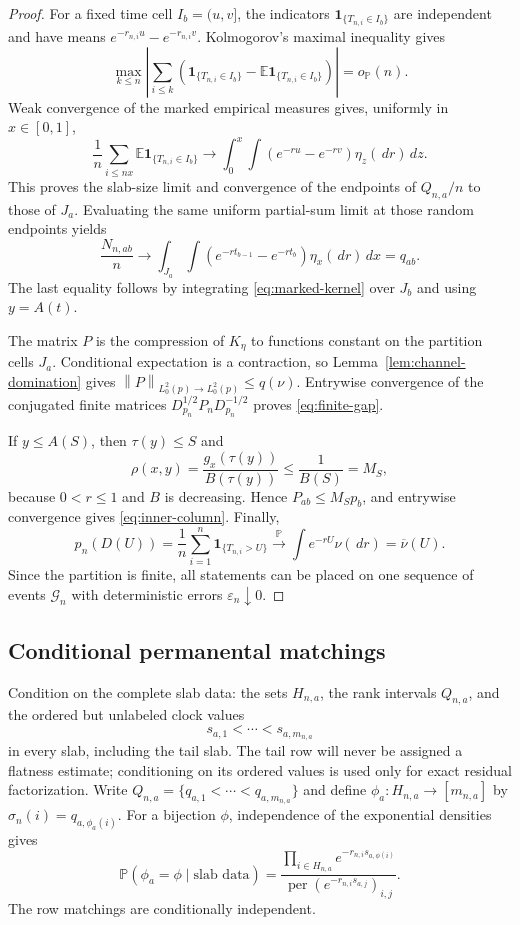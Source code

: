 \documentclass[11pt]{article}
\theoremstyle{definition}
\theoremstyle{remark}
\newcommand{\Pp}{\mathbb P}
\newcommand{\Ee}{\mathbb E}
\newcommand{\one}{\mathbf 1}
\newcommand{\dd}{\,d}
\newcommand{\eps}{\varepsilon}
\newcommand{\cG}{\mathcal G}
\newcommand{\norm}[1]{\left\lVert#1\right\rVert}
\begin{document}
\begin{proof}
For a fixed time cell $I_b=(u,v]$, the indicators
$\one_{\{T_{n,i}\in I_b\}}$ are independent and have means
$e^{-r_{n,i}u}-e^{-r_{n,i}v}$.  Kolmogorov's maximal inequality gives
\[
 \max_{k\le n}\left|\sum_{i\le k}
 \left(\one_{\{T_{n,i}\in I_b\}}
       -\Ee\one_{\{T_{n,i}\in I_b\}}\right)\right|=o_{\Pp}(n).
\]
Weak convergence of the marked empirical measures gives, uniformly in
$x\in[0,1]$,
\[
 \frac1n\sum_{i\le nx}\Ee\one_{\{T_{n,i}\in I_b\}}
 \longrightarrow
 \int_0^x\int
  (e^{-ru}-e^{-rv})\eta_z(\dd r)\dd z.
\]
This proves the slab-size limit and convergence of the endpoints of
$Q_{n,a}/n$ to those of $J_a$.  Evaluating the same uniform partial-sum limit
at those random endpoints yields
\[
 \frac{N_{n,ab}}n\longrightarrow
 \int_{J_a}\int(e^{-rt_{b-1}}-e^{-rt_b})\eta_x(\dd r)\dd x=q_{ab}.
\]
The last equality follows by integrating \eqref{eq:marked-kernel} over $J_b$
and using $y=A(t)$.

The matrix $P$ is the compression of $K_\eta$ to functions constant on the
partition cells $J_a$.  Conditional expectation is a contraction, so
Lemma~\ref{lem:channel-domination} gives
$\norm{P}_{L^2_0(p)\to L^2_0(p)}\le q(\nu)$.  Entrywise convergence of the
conjugated finite matrices
$D_{p_n}^{1/2}P_nD_{p_n}^{-1/2}$ proves \eqref{eq:finite-gap}.

If $y\le A(S)$, then $\tau(y)\le S$ and
\[
 \rho(x,y)=\frac{g_x(\tau(y))}{B(\tau(y))}
 \le\frac1{B(S)}=M_S,
\]
because $0<r\le1$ and $B$ is decreasing.  Hence
$P_{ab}\le M_Sp_b$, and entrywise convergence gives
\eqref{eq:inner-column}.  Finally,
\[
 p_n(D(U))=\frac1n\sum_{i=1}^n\one_{\{T_{n,i}>U\}}
 \xrightarrow{\Pp}\int e^{-rU}\nu(\dd r)=\overline\nu(U).
\]
Since the partition is finite, all statements can be placed on one sequence of
events $\cG_n$ with deterministic errors $\eps_n\downarrow0$.
\end{proof}

\subsection{Conditional permanental matchings}

Condition on the complete slab data: the sets $H_{n,a}$, the rank intervals
$Q_{n,a}$, and the ordered but unlabeled clock values
\[
 s_{a,1}<\cdots<s_{a,m_{n,a}}
\]
in every slab, including the tail slab.  The tail row will never be assigned a
flatness estimate; conditioning on its ordered values is used only for exact
residual factorization.  Write
$Q_{n,a}=\{q_{a,1}<\cdots<q_{a,m_{n,a}}\}$ and define
$\phi_a:H_{n,a}\to[m_{n,a}]$ by
$\sigma_n(i)=q_{a,\phi_a(i)}$.  For a bijection $\phi$,
independence of the exponential densities gives
\begin{equation}
 \Pp(\phi_a=\phi\mid\text{slab data})
 =\frac{\prod_{i\in H_{n,a}}e^{-r_{n,i}s_{a,\phi(i)}}}
 {\operatorname{per}(e^{-r_{n,i}s_{a,j}})_{i,j}}.
 \label{eq:permanental-row}
\end{equation}
The row matchings are conditionally independent.
\end{document}

